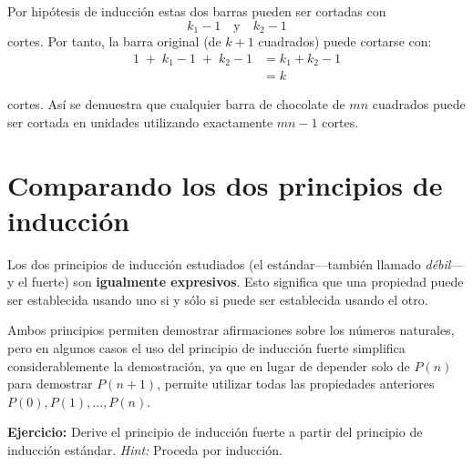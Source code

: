Por hipótesis de inducción estas dos barras pueden ser cortadas con $$k_1 - 1 \quad \text{y} \quad k_2-1$$ cortes. Por tanto, la barra original (de $k+1$ cuadrados) puede cortarse con:
\begin{align*}
    1 \; + \; k_1 - 1  \; + \; k_2 - 1 &= k_1 + k_2 -1 \\
    &= k
\end{align*}

cortes. Así se demuestra que cualquier barra de chocolate de $mn$ cuadrados puede ser cortada en unidades utilizando exactamente $mn - 1$ cortes.

\section{Comparando los dos principios de inducción}

Los dos principios de inducción estudiados (el estándar---también llamado \emph{débil}---y el fuerte) son \textbf{igualmente expresivos}. Esto significa que una propiedad puede ser establecida usando uno si y sólo si puede ser establecida usando el otro. 

Ambos principios permiten demostrar afirmaciones sobre los números naturales, pero en algunos casos el uso del principio de inducción fuerte simplifica considerablemente la demostración, ya que en lugar de depender solo de \( P(n) \) para demostrar \( P(n+1) \), permite utilizar todas las propiedades anteriores \( P(0), P(1), ..., P(n) \).

\medskip
\medskip

\textbf{Ejercicio:} Derive el principio de inducción fuerte a partir del principio de inducción estándar. \textit{Hint:} Proceda por inducción.



    
    
